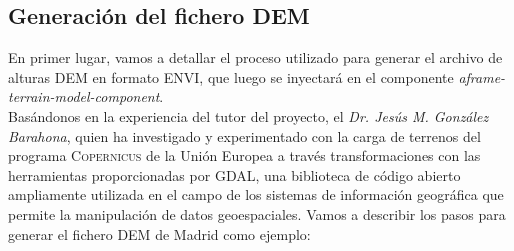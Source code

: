 \documentclass[a4paper, 11pt]{book}
\begin{document}
\subsection{Generación del fichero DEM}
\label{sec:dem}
En primer lugar, vamos a detallar el proceso utilizado para generar el archivo de alturas \textsc{DEM} en formato \textsc{ENVI}, que luego se inyectará en el componente \emph{aframe-terrain-model-component}.\\
Basándonos en la experiencia del tutor del proyecto, el \emph{Dr. Jesús M. González Barahona}, quien ha investigado y experimentado con la carga de terrenos del programa \textsc{Copernicus} de la Unión Europea a través transformaciones con las herramientas proporcionadas por \textsc{GDAL}, una biblioteca de código abierto ampliamente utilizada en el campo de los sistemas de información geográfica que permite la manipulación de datos geoespaciales.
Vamos a describir los pasos para generar el fichero \textsc{DEM} de Madrid como ejemplo:
\label{manual:generacionDem}
\end{document}
